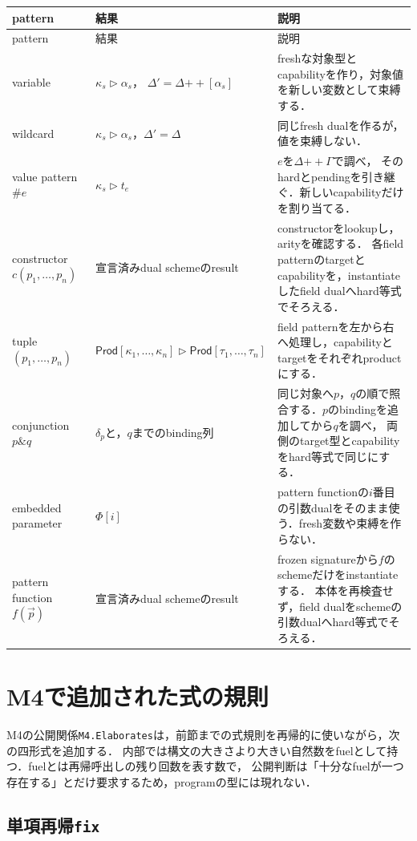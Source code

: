 \documentclass[11pt,a4paper,oneside]{ltjsbook}
\newcommand{\code}[1]{\texttt{#1}}
\newcommand{\Prod}{\mathsf{Prod}}
\begin{document}
\begin{longtable}{p{24mm}p{48mm}p{65mm}}
\toprule
pattern & 結果 & 説明 \\
\midrule
\endfirsthead
\toprule
pattern & 結果 & 説明 \\
\midrule
\endhead
variable & $\kappa_s\triangleright\alpha_s$，
$\Delta'=\Delta\mathbin{+\!+}[\alpha_s]$ & freshな対象型とcapabilityを作り，対象値を新しい変数として束縛する．\\
wildcard & $\kappa_s\triangleright\alpha_s$，$\Delta'=\Delta$ & 同じfresh dualを作るが，値を束縛しない．\\
value pattern $\#e$ & $\kappa_s\triangleright t_e$ & $e$を$\Delta\mathbin{+\!+}\Gamma$で調べ，
そのhardとpendingを引き継ぐ．新しいcapabilityだけを割り当てる．\\
constructor $c(p_1,\ldots,p_n)$ & 宣言済みdual schemeのresult & constructorをlookupし，arityを確認する．
各field patternのtargetとcapabilityを，instantiateしたfield dualへhard等式でそろえる．\\
tuple $(p_1,\ldots,p_n)$ &
$\Prod[\kappa_1,\ldots,\kappa_n]\triangleright
 \Prod[\tau_1,\ldots,\tau_n]$ & field patternを左から右へ処理し，capabilityとtargetをそれぞれproductにする．\\
conjunction $p\mathbin{\&}q$ & $\delta_p$と，$q$までのbinding列 & 同じ対象へ$p$，$q$の順で照合する．$p$のbindingを追加してから$q$を調べ，
両側のtarget型とcapabilityをhard等式で同じにする．\\
embedded parameter & $\Phi[i]$ & pattern functionの$i$番目の引数dualをそのまま使う．fresh変数や束縛を作らない．\\
pattern function $f(\vec p)$ & 宣言済みdual schemeのresult & frozen signatureから$f$のschemeだけをinstantiateする．
本体を再検査せず，field dualをschemeの引数dualへhard等式でそろえる．\\
\bottomrule
\end{longtable}

\section{M4で追加された式の規則}

M4の公開関係\code{M4.Elaborates}は，前節までの式規則を再帰的に使いながら，次の四形式を追加する．
内部では構文の大きさより大きい自然数をfuelとして持つ．fuelとは再帰呼出しの残り回数を表す数で，
公開判断は「十分なfuelが一つ存在する」とだけ要求するため，programの型には現れない．

\subsection{単項再帰\code{fix}}
\end{document}
